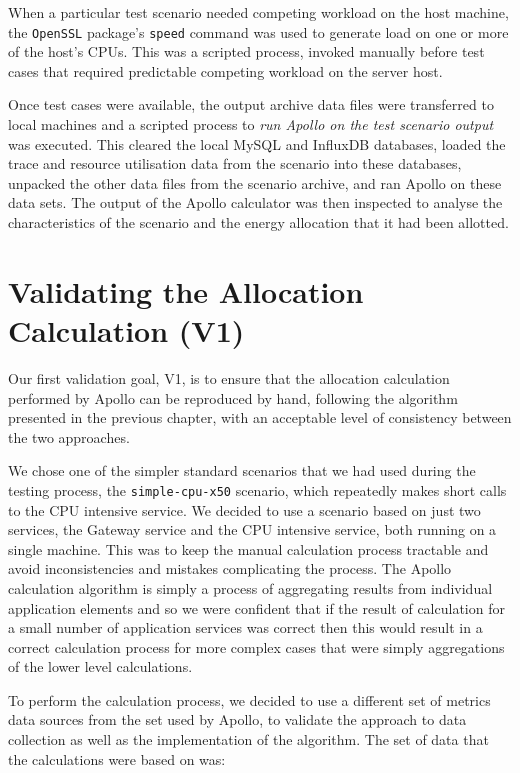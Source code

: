 When a particular test scenario needed competing workload on the host machine, the \texttt{OpenSSL} package's \texttt{speed} command was used to generate load on one or more of the host's CPUs.  This was a scripted process, invoked manually before test cases that required predictable competing workload on the server host.

Once test cases were available, the output archive data files were transferred to local machines and a scripted process to \emph{run Apollo on the test scenario output} was executed. This cleared the local MySQL and InfluxDB databases, loaded the trace and resource utilisation data from the scenario into these databases, unpacked the other data files from the scenario archive, and ran Apollo on these data sets.  The output of the Apollo calculator was then inspected to analyse the characteristics of the scenario and the energy allocation that it had been allotted.


\section{Validating the Allocation Calculation (V1)}
\label{sec:validatingcalculation}

Our first validation goal, V1, is to ensure that the allocation calculation performed by Apollo can be reproduced by hand, following the algorithm presented in the previous chapter, with an acceptable level of consistency between the two approaches.

We chose one of the simpler standard scenarios that we had used during the testing process, the \texttt{simple-cpu-x50} scenario, which repeatedly makes short calls to the CPU intensive service.  We decided to use a scenario based on just two services, the Gateway service and the CPU intensive service, both running on a single machine.  This was to keep the manual calculation process tractable and avoid inconsistencies and mistakes complicating the process.  The Apollo calculation algorithm is simply a process of aggregating results from individual application elements and so we were confident that if the result of calculation for a small number of application services was correct then this would result in a correct calculation process for more complex cases that were simply aggregations of the lower level calculations.

To perform the calculation process, we decided to use a different set of metrics data sources from the set used by Apollo, to validate the approach to data collection as well as the implementation of the algorithm.  The set of data that the calculations were based on was:


